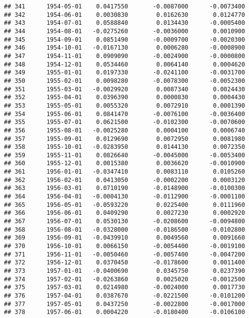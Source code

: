 \documentclass[
]{article}
\begin{document}
\begin{verbatim}
## 341      1954-05-01    0.0417550       -0.0087000      -0.0073400
## 342      1954-06-01    0.0030830        0.0162630       0.0124770
## 343      1954-07-01    0.0588840        0.0134430      -0.0005400
## 344      1954-08-01   -0.0275260       -0.0036000       0.0010900
## 345      1954-09-01    0.0851490       -0.0009700      -0.0020300
## 346      1954-10-01   -0.0167130        0.0006280      -0.0008900
## 347      1954-11-01    0.0909090       -0.0024900      -0.0000800
## 348      1954-12-01    0.0534460        0.0064140       0.0004620
## 349      1955-01-01    0.0197330       -0.0241100      -0.0031700
## 350      1955-02-01    0.0098280       -0.0078300      -0.0052300
## 351      1955-03-01   -0.0029920        0.0087340       0.0024430
## 352      1955-04-01    0.0396390        0.0000830       0.0004430
## 353      1955-05-01    0.0055320        0.0072910       0.0001390
## 354      1955-06-01    0.0841470       -0.0076100      -0.0036400
## 355      1955-07-01    0.0621500       -0.0102300      -0.0070600
## 356      1955-08-01   -0.0025280        0.0004100       0.0006740
## 357      1955-09-01    0.0129690        0.0072950       0.0081980
## 358      1955-10-01   -0.0283950        0.0144130       0.0072350
## 359      1955-11-01    0.0826640       -0.0045000      -0.0053400
## 360      1955-12-01    0.0015380        0.0036620      -0.0010900
## 361      1956-01-01   -0.0347410        0.0083110       0.0105260
## 362      1956-02-01    0.0413050       -0.0002200       0.0003120
## 363      1956-03-01    0.0710190       -0.0148900      -0.0100300
## 364      1956-04-01   -0.0004130       -0.0112900      -0.0001100
## 365      1956-05-01   -0.0593220        0.0225400       0.0111960
## 366      1956-06-01    0.0409290        0.0027230       0.0002920
## 367      1956-07-01    0.0530130       -0.0208600      -0.0094800
## 368      1956-08-01   -0.0328000       -0.0186500      -0.0102800
## 369      1956-09-01   -0.0439910        0.0049560       0.0091660
## 370      1956-10-01    0.0066150       -0.0054400      -0.0019100
## 371      1956-11-01   -0.0050460       -0.0057400      -0.0047200
## 372      1956-12-01    0.0370450       -0.0178600       0.0011400
## 373      1957-01-01   -0.0400690        0.0345750       0.0237390
## 374      1957-02-01   -0.0263860        0.0025020      -0.0012500
## 375      1957-03-01    0.0214980       -0.0024000       0.0017730
## 376      1957-04-01    0.0387670       -0.0221500      -0.0101200
## 377      1957-05-01    0.0437250       -0.0022800      -0.0017000
## 378      1957-06-01    0.0004220       -0.0180400      -0.0106100

\end{verbatim}
\end{document}
